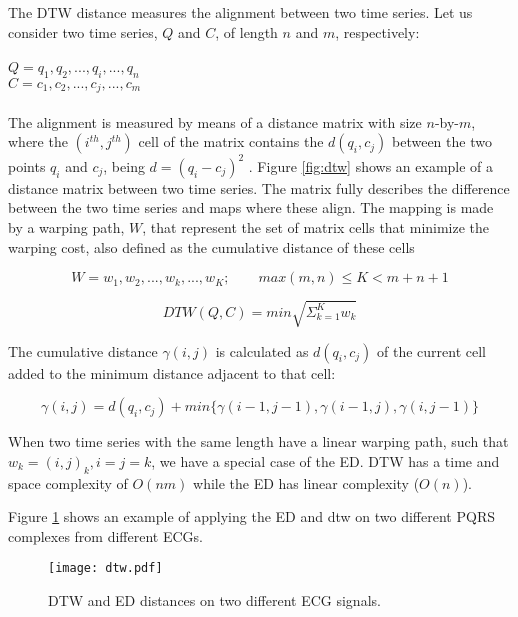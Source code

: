 The DTW distance measures the alignment between two time series. Let us consider two time series, $Q$ and $C$, of length $n$ and $m$, respectively:\\
\\
$Q = q_1, q_2, ..., q_i, ..., q_n$\\
$C = c_1, c_2, ..., c_j, ..., c_m$\\
\\
The alignment is measured by means of a distance matrix with size $n$-by-$m$, where the $(i^{th},j^{th})$ cell of the matrix contains the $d(q_i, c_j)$ between the two points $q_i$ and $c_j$, being $d=(q_i - c_j)^2$ \cite{dtw}. Figure \ref{fig:dtw} shows an example of a distance matrix between two time series. The matrix fully describes the difference between the two time series and maps where these align. The mapping is made by a warping path, $W$, that represent the set of matrix cells that minimize the warping cost, also defined as the cumulative distance of these cells \cite{dtw}

\begin{equation}
W = w_1, w_2, ..., w_k, ..., w_K; \quad \quad max(m,n) \leq K < m+n+1
\end{equation} 

\begin{equation}
DTW(Q,C) = min \sqrt{\Sigma^K_{k=1} w_k}
\end{equation} 

The cumulative distance $\gamma(i,j)$ is calculated as $d(q_i,c_j)$ of the current cell added to the minimum distance adjacent to that cell:

\begin{equation}
\gamma(i,j) = d(q_i,c_j)+min\{\gamma(i-1,j-1), \gamma(i-1, j), \gamma(i, j-1)\}
\end{equation} 

When two time series with the same length have a linear warping path, such that $w_k=(i,j)_k, i=j=k$, we have a special case of the ED. DTW has a time and space complexity of $O(nm)$ while the ED has linear complexity ($O(n)$).
\par
Figure \ref{fig:dtw_intro} shows an example of applying the \gls{ED} and \gls{dtw} on two different PQRS complexes from different \gls{ECG}s. 

\begin{figure}
\centering
\texttt{[image: dtw.pdf]}
\label{fig:dtw_intro}
\caption{DTW and ED distances on two different ECG signals.}
\end{figure}


